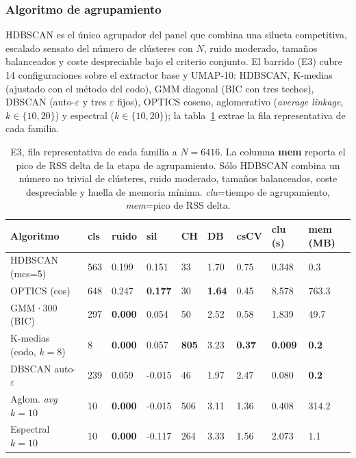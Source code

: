 \subsubsection{Algoritmo de agrupamiento}
\label{subsubsec:res-agrupamiento}
HDBSCAN es el único agrupador del panel que combina una silueta competitiva,
escalado sensato del número de clústeres con $N$, ruido moderado, tamaños
balanceados y coste despreciable bajo el criterio conjunto. El barrido (E3)
cubre 14 configuraciones sobre el extractor base y UMAP-10: HDBSCAN, K-medias
(ajustado con el método del codo), GMM diagonal (BIC con tres techos), DBSCAN
(auto-$\varepsilon$ y tres $\varepsilon$ fijos), OPTICS coseno, aglomerativo
(\textit{average linkage}, $k\in\{10, 20\}$) y espectral ($k\in\{10, 20\}$); la
tabla~\ref{tab:e3-summary-6416} extrae la fila representativa de cada familia.

\begin{table}[h]
  \centering
{\footnotesize
\begin{tabular}{|p{2.4cm}|p{0.9cm}|p{1.0cm}|p{1.1cm}|p{0.8cm}|p{0.8cm}|p{0.9cm}|p{1.0cm}|p{1.0cm}|} \hline
  \textbf{Algoritmo} & \textbf{cls} & \textbf{ruido} & \textbf{sil} & \textbf{CH} & \textbf{DB} & \textbf{csCV} & \textbf{clu (s)} & \textbf{mem (MB)} \\ \hline
  HDBSCAN (mcs=5)        & 563 & 0.199 &  0.151 &  33 & 1.70 & 0.75 & 0.348 & 0.3 \\ \hline
  OPTICS (cos)           & 648 & 0.247 &  \textbf{0.177} &  30 & \textbf{1.64} & 0.45 & 8.578 & 763.3 \\ \hline
  GMM·300 (BIC)          & 297 & \textbf{0.000} &  0.054 &  50 & 2.52 & 0.58 & 1.839 & 49.7 \\ \hline
  K-medias (codo, $k=8$)   &   8 & \textbf{0.000} &  0.057 & \textbf{805} & 3.23 & \textbf{0.37} & \textbf{0.009} & \textbf{0.2} \\ \hline
  DBSCAN auto-$\varepsilon$ & 239 & 0.059 & -0.015 & 46 & 1.97 & 2.47 & 0.080 & \textbf{0.2} \\ \hline
  Aglom. \textit{avg} $k=10$ &  10 & \textbf{0.000} & -0.015 & 506 & 3.11 & 1.36 & 0.408 & 314.2 \\ \hline
  Espectral $k=10$       &  10 & \textbf{0.000} & -0.117 & 264 & 3.33 & 1.56 & 2.073 & 1.1 \\ \hline
\end{tabular}
}
  \caption[E3, fila representativa por familia a $N=6416$]{E3, fila representativa de cada familia a $N=6416$. La columna
  \textbf{mem} reporta el pico de RSS delta de la etapa de agrupamiento. Sólo
  HDBSCAN combina un número no trivial de clústeres, ruido moderado, tamaños
  balanceados, coste despreciable y huella de memoria mínima. \glosacalidad{}
  \textit{clu}=tiempo de agrupamiento, \textit{mem}=pico de RSS delta.}
  \label{tab:e3-summary-6416}
\end{table}


